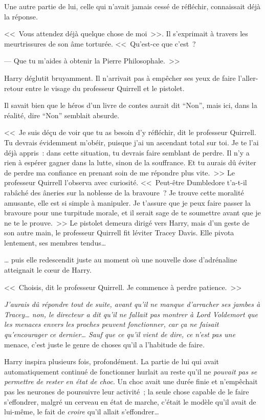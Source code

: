 Une autre partie de lui, celle qui n'avait jamais cessé de réfléchir, connaissait déjà la réponse.

<<~Vous attendez déjà quelque chose de moi~>>. Il s'exprimait à travers les meurtrissures de son âme torturée. <<~Qu'est-ce que c'est~?

--- Que tu m'aides à obtenir la Pierre Philosophale.~>>

Harry déglutit bruyamment. Il n'arrivait pas à empêcher ses yeux de faire l'aller-retour entre le visage du professeur Quirrell et le pistolet.

Il savait bien que le héros d'un livre de contes aurait dit “Non”, mais ici, dans la réalité, dire “Non” semblait absurde.

<<~Je suis déçu de voir que tu as besoin d'y réfléchir, dit le professeur Quirrell. Tu devrais évidemment m'obéir, puisque j'ai un ascendant total sur toi. Je te l'ai déjà appris~: dans cette situation, tu devrais faire semblant de perdre. Il n'y a rien à espérer gagner dans la lutte, sinon de la souffrance. Et tu aurais dû éviter de perdre ma confiance en prenant soin de me répondre plus vite.~>> Le professeur Quirrell l'observa avec curiosité. <<~Peut-être Dumbledore t'a-t-il rabâché des âneries sur la noblesse de la bravoure~? Je trouve cette moralité amusante, elle est si simple à manipuler. Je t'assure que je peux faire passer la bravoure pour une turpitude morale, et il serait sage de te soumettre avant que je ne te le prouve.~>> Le pistolet demeura dirigé vers Harry, mais d'un geste de son autre main, le professeur Quirrell fit léviter Tracey Davis. Elle pivota lentement, ses membres tendus…

… puis elle redescendit juste au moment où une nouvelle dose d'adrénaline atteignait le cœur de Harry.

<<~Choisis, dit le professeur Quirrell. Je commence à perdre patience.~>>

\emph{J'aurais dû répondre tout de suite, avant qu'il ne manque d'arracher ses jambes à Tracey… non, le directeur a dit qu'il ne fallait pas montrer à Lord Voldemort que les menaces envers les proches peuvent fonctionner, car ça ne faisait qu'encourager ce dernier… Sauf que ce qu'il vient de dire, ce n'est pas une} menace, c'est juste le genre de choses qu'il a l'habitude de faire\emph{.}

Harry inspira plusieurs fois, profondément. La partie de lui qui avait automatiquement continué de fonctionner hurlait au reste qu'il ne \emph{pouvait pas se permettre de rester en état de choc}. Un choc avait une durée finie et n'empêchait pas les neurones de poursuivre leur activité~; la seule chose capable de le faire s'effondrer, malgré un cerveau en état de marche, c'était le modèle qu'il avait de lui-même, le fait de \emph{croire} qu'il allait s'effondrer…

